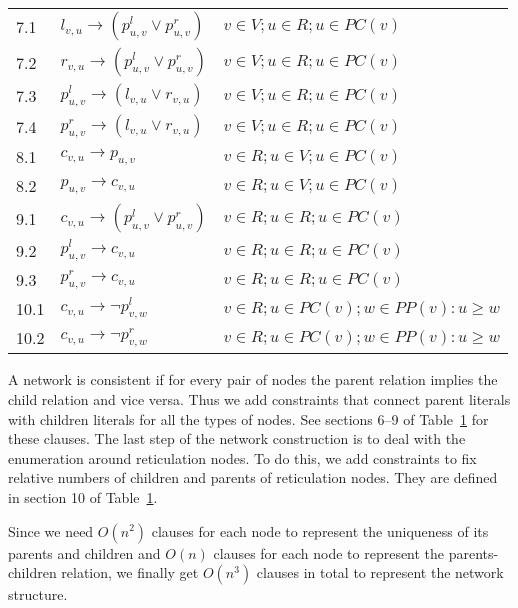 \documentclass[runningheads, envcountsame, a4paper]{llncs}
\begin{document}
\begin{table}[t]
\begin{tabular}{l | l | l}
  \hline
  7.1 &
  $l_{v,u} \rightarrow (p^l_{u,v} \vee p^r_{u,v})$ &
  $v \in V; u \in R; u \in PC(v)$
  \\
  7.2 &
  $r_{v,u} \rightarrow (p^l_{u,v} \vee p^r_{u,v})$ &
  $v \in V; u \in R; u \in PC(v)$
  \\
  7.3 &
  $p^l_{u,v} \rightarrow (l_{v,u} \vee r_{v,u})$ &
  $v \in V; u \in R; u \in PC(v)$
  \\
  7.4 &
  $p^r_{u,v} \rightarrow (l_{v,u} \vee r_{v,u})$ &
  $v \in V; u \in R; u \in PC(v)$
  \\
  
  \hline 
  8.1 &
  $c_{v,u} \rightarrow p_{u,v}$ &
  $v \in R; u \in V; u \in PC(v)$
  \\
  8.2 &
  $p_{u,v} \rightarrow c_{v,u}$ &
  $v \in R; u \in V; u \in PC(v)$
  \\
  
  \hline
  9.1 &
  $c_{v,u} \rightarrow (p^l_{u,v} \vee p^r_{u,v})$ &
  $v \in R; u \in R; u \in PC(v)$
  \\
  9.2 &
  $p^l_{u,v} \rightarrow c_{v,u}$ &
  $v \in R; u \in R; u \in PC(v)$
  \\
  9.3 &
  $p^r_{u,v} \rightarrow c_{v,u}$ &
  $v \in R; u \in R; u \in PC(v)$
  \\
  
  \hline
  10.1 &
  $c_{v,u} \rightarrow \neg p^l_{v,w}$ &
  $v \in R; u \in PC(v); w \in PP(v): u \geq w$
  \\
  10.2 &
  $c_{v,u} \rightarrow \neg p^r_{v,w}$ &
  $v \in R; u \in PC(v); w \in PP(v): u \geq w$
  \\
  
\end{tabular}
\label{network-table}
\end{table}

A network is consistent if for every pair of nodes the parent relation implies the child relation and vice versa. Thus we add constraints that connect parent literals with children literals for all the types of nodes. See sections 6--9 of Table~\ref{network-table} for these clauses.
The last step of the network construction is to deal with the enumeration around reticulation nodes. To do this, we add constraints to fix 
relative numbers of children and parents of reticulation nodes. They are defined in section 10 of Table~\ref{network-table}.

Since we need $O(n^2)$ clauses for each node to represent the uniqueness of its parents and children 
and $O(n)$ clauses for each node to represent the parents-children relation, we finally get $O(n^3)$ clauses in total 
to represent the network structure.
\end{document}
